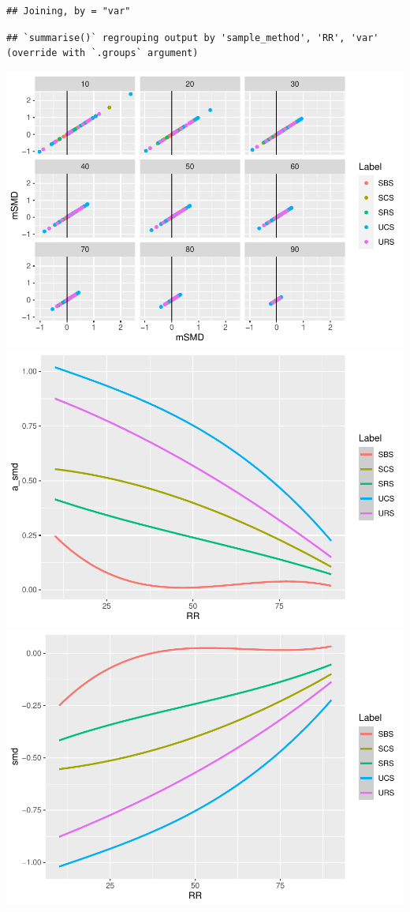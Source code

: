 \documentclass[
  english,
  man,floatsintext]{apa6}
\begin{document}
\begin{verbatim}
## Joining, by = "var"
\end{verbatim}

\begin{verbatim}
## `summarise()` regrouping output by 'sample_method', 'RR', 'var' (override with `.groups` argument)
\end{verbatim}

\includegraphics{5---Analysis_files/figure-latex/unnamed-chunk-27-1.pdf} \includegraphics{5---Analysis_files/figure-latex/unnamed-chunk-27-2.pdf} \includegraphics{5---Analysis_files/figure-latex/unnamed-chunk-27-3.pdf}
\end{document}
